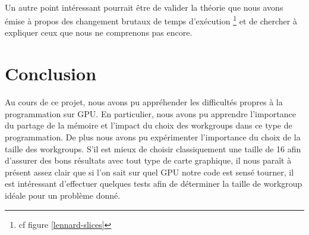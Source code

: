 \documentclass{article}
\begin{document}
\paragraph{}
Un autre point intéressant pourrait être de valider la théorie que nous avons
émise à propos des changement brutaux de temps d'exécution
\footnote{cf figure \ref{lennard-slices}} et de chercher à expliquer ceux
que nous ne comprenons pas encore.

\section{Conclusion}
Au cours de ce projet, nous avons pu appréhender les difficultés propres à la
programmation sur GPU. En particulier, nous avons pu apprendre l'importance
du partage de la mémoire et l'impact du choix des workgroups dans ce type de
programmation. De plus nous avons pu expérimenter l'importance du choix de la
taille des workgroups. S'il est mieux de choisir classiquement une taille de
16 afin d'assurer des bons résultats avec tout type de carte graphique, il
nous paraît à présent assez clair que si l'on sait sur quel GPU notre code
est sensé tourner, il est intéressant d'effectuer quelques tests afin de
déterminer la taille de workgroup idéale pour un problème donné.
\end{document}
